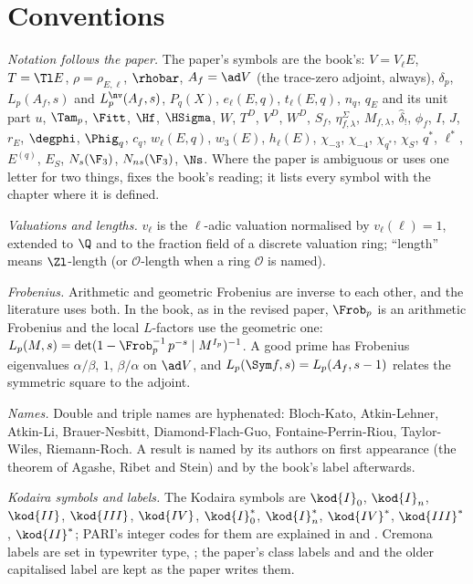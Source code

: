 \section*{Conventions}

\emph{Notation follows the paper.} The paper's symbols are the book's: $V=V_\ell E$, $T=\Tl E$,
$\rho=\rho_{E,\ell}$, $\rhobar$, $A_f=\ad V$ (the trace-zero adjoint, always), $\delta_p$,
$L_p(A_f,s)$ and $L_p^{\nv}(A_f,s)$, $P_q(X)$, $e_\ell(E,q)$, $t_\ell(E,q)$, $n_q$, $q_E$ and its
unit part $u$, $\Tam_p$, $\Fitt$, $\Hf$, $\HSigma$, $W$, $T^D$, $V^D$, $W^D$, $S_f$,
$\eta^\Sigma_{f,\lambda}$, $M_{f,\lambda}$, $\hat\delta_!$, $\phi_f$, $I$, $J$, $r_E$, $\degphi$,
$\Phig_q$, $c_q$, $w_\ell(E,q)$, $w_3(E)$, $h_\ell(E)$, $\chi_{-3}$, $\chi_{-4}$, $\chi_{q^*}$,
$\chi_S$, $q^*$, $\ell^*$, $E^{(q)}$, $E_S$, $N_s(\F_3)$, $N_{ns}(\F_3)$, $\Ns$. Where the paper is
ambiguous or uses one letter for two things,  fixes the book's reading; it lists
every symbol with the chapter where it is defined.

\emph{Valuations and lengths.} $v_\ell$ is the $\ell$-adic valuation normalised by $v_\ell(\ell)=1$,
extended to $\Q$ and to the fraction field of a discrete valuation ring; ``length'' means
$\Zl$-length (or $\mathcal{O}$-length when a ring $\mathcal{O}$ is named).

\emph{Frobenius.} Arithmetic and geometric Frobenius are inverse to each other, and the literature
uses both. In the book, as in the revised paper, $\Frob_p$ is an arithmetic Frobenius and the
local $L$-factors use the geometric one:
$L_p(M,s)=\det(1-\Frob_p^{-1}\,p^{-s}\mid M^{I_p})^{-1}$. A good prime has Frobenius eigenvalues
$\alpha/\beta$, $1$, $\beta/\alpha$ on $\ad V$, and $L_p(\Sym f,s)=L_p(A_f,s-1)$ relates the
symmetric square to the adjoint.

\emph{Names.} Double and triple names are hyphenated: Bloch-Kato, Atkin-Lehner, Atkin-Li,
Brauer-Nesbitt, Diamond-Flach-Guo, Fontaine-Perrin-Riou, Taylor-Wiles, Riemann-Roch. A result is
named by its authors on first appearance (the theorem of Agashe, Ribet and Stein) and by the
book's label afterwards.

\emph{Kodaira symbols and labels.} The Kodaira symbols are $\kod{I}_0$, $\kod{I}_n$, $\kod{II}$,
$\kod{III}$, $\kod{IV}$, $\kod{I}_0^*$, $\kod{I}_n^*$, $\kod{IV}^*$, $\kod{III}^*$, $\kod{II}^*$;
PARI's integer codes for them are explained in  and .
Cremona labels are set in typewriter type, ; the paper's class labels 
and  and the older capitalised label  are kept as the paper writes them.

